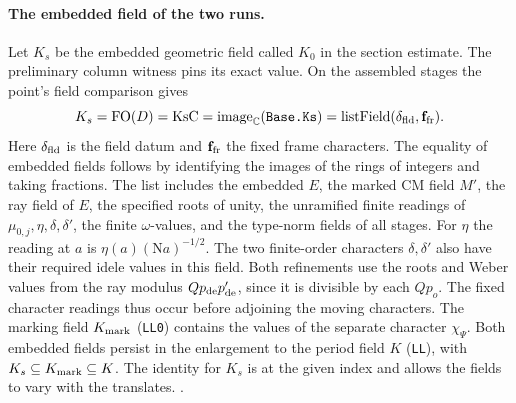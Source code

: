 \paragraph{The embedded field of the two runs.}
\leavevmode{}%
Let \(K_s\) be the embedded geometric field called \(K_0\) in the
section estimate. The preliminary column witness pins its exact
value. On the assembled stages the point's field comparison gives
\[
 K_s=\operatorname{FO}(D)=\operatorname{KsC}
 =\operatorname{image}_{\mathbb C}(\text{\texttt{Base.Ks}})
 =\operatorname{listField}(\delta_{\rm fld},\mathbf f_{\rm fr}) .
\]
Here \(\delta_{\rm fld}\) is the field datum and \(\mathbf f_{\rm fr}\) the fixed
frame characters. The equality of embedded fields follows by identifying
the images of the rings of integers and taking fractions. The list
includes the embedded \(E\), the marked CM field \(M'\), the ray
field of \(E\), the specified roots of unity, the unramified finite
readings of \(\mu_{0,j},\eta,\delta,\delta'\), the finite
\(\omega\)-values, and the type-norm fields of all stages. For
\(\eta\) the reading at \(a\) is \(\eta(a)(\mathrm{N}a)^{-1/2}\).
The two finite-order characters \(\delta,\delta'\) also have
their required idele values in this field. Both refinements
use the roots and Weber values from the ray modulus
\(Qp_{\rm de}p'_{\rm de}\), since it is divisible by each \(Qp_o\).
The fixed character readings thus occur before adjoining the
moving characters. The marking field \(K_{\rm mark}\) (\texttt{LL0})
contains the values of the separate character \(\chi_\Psi\).
Both embedded fields persist in the enlargement to the period
field \(K\) (\texttt{LL}), with \(K_s\subseteq K_{\rm mark}\subseteq K\).
The identity for \(K_s\) is at the given index and allows the
fields to vary with the translates.
.


